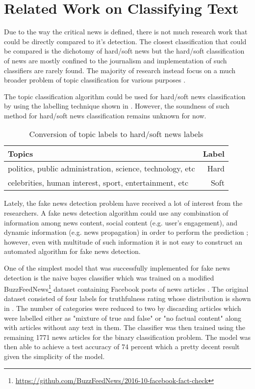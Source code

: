 \section{Related Work on Classifying Text} \label{related_works}
Due to the way the critical news is defined, there is not much research work that could be directly compared to it's detection. The closest classification that could be compared is the dichotomy of hard/soft news but the hard/soft classification of news are mostly confined to the journalism and implementation of such classifiers are rarely found. The majority of research instead focus on a much broader problem of topic classification for various purposes \cite{wang2012baselines, lee2011twitter, joachims1998text, nigam2000text}.

The topic classification algorithm could be used for hard/soft news classification by using the labelling technique shown in . However, the soundness of such method for hard/soft news classification remains unknown for now.

\begin{table}[h]
\begin{center}
\caption{Conversion of topic labels to hard/soft news labels}
\label{tbl:topics_to_hard_soft}
\begin{tabular}{lr}
\toprule 
Topics&Label \\
\midrule 
politics, public administration, science, technology, etc & Hard\\
\hline
celebrities, human interest, sport, entertainment, etc & Soft\\
\bottomrule
\end{tabular}
\end{center}
\end{table}

Lately, the fake news detection problem have received a lot of interest from the researchers. A fake news detection algorithm could use any combination of information among news content, social content (e.g. user's engagement), and dynamic information (e.g. news propagation) in order to perform the prediction \cite{shu2018fakenewsnet}; however, even with multitude of such information it is not easy to construct an automated algorithm for fake news detection\cite{shu2017fake}.

One of the simplest model that was successfully implemented for fake news detection is the naive bayes classifier which was trained on a modified BuzzFeedNews\footnote{\url{https://github.com/BuzzFeedNews/2016-10-facebook-fact-check}} dataset containing Facebook posts of news articles \cite{granik2017fake}. The original dataset consisted of four labels for truthfulness rating whose distribution is shown in . The number of categories were reduced to two by discarding articles which were labelled either as "mixture of true and false" or "no factual content" along with articles without any text in them. The classifier was then trained using the remaining 1771 news articles for the binary classification problem. The model was then able to achieve a test accuracy of 74 percent which a pretty decent result given the simplicity of the model.

